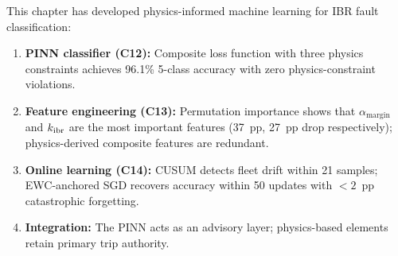 This chapter has developed physics-informed machine learning for IBR
fault classification:
\begin{enumerate}
\item \textbf{PINN classifier (C12):} Composite loss function with three
      physics constraints achieves 96.1\% 5-class accuracy with zero
      physics-constraint violations.
\item \textbf{Feature engineering (C13):} Permutation importance shows
      that $\alpha_\mathrm{margin}$ and $k_{\mathrm{ibr}}$ are the most important
      features (37~pp, 27~pp drop respectively); physics-derived composite
      features are redundant.
\item \textbf{Online learning (C14):} CUSUM detects fleet drift within
      21 samples; EWC-anchored SGD recovers accuracy within 50 updates
      with $< 2$~pp catastrophic forgetting.
\item \textbf{Integration:} The PINN acts as an advisory layer; physics-based
      elements retain primary trip authority.
\end{enumerate}
